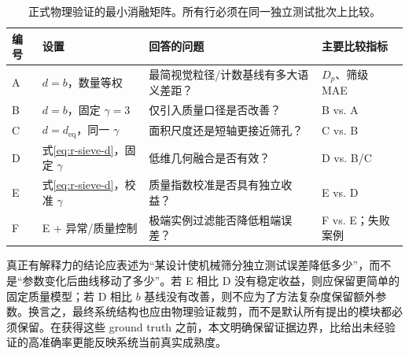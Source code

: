 \begin{table}[t]
\centering
\caption{正式物理验证的最小消融矩阵。所有行必须在同一独立测试批次上比较。}
\label{tab:r-ablation-matrix}
\footnotesize
\renewcommand{\arraystretch}{1.1}
\begin{tabular}{>{\centering\arraybackslash}p{0.8cm}>{\raggedright\arraybackslash}p{4.0cm}>{\raggedright\arraybackslash}p{4.6cm}>{\raggedright\arraybackslash}p{4.0cm}}
\toprule
编号 & 设置 & 回答的问题 & 主要比较指标 \\
\midrule
A & $d=b$，数量等权 & 最简视觉粒径/计数基线有多大语义差距？ & $D_p$、筛级 MAE \\
B & $d=b$，固定 $\gamma=3$ & 仅引入质量口径是否改善？ & B vs. A \\
C & $d=d_{\mathrm{eq}}$，同一 $\gamma$ & 面积尺度还是短轴更接近筛孔？ & C vs. B \\
D & 式\eqref{eq:r-sieve-d}，固定 $\gamma$ & 低维几何融合是否有效？ & D vs. B/C \\
E & 式\eqref{eq:r-sieve-d}，校准 $\gamma$ & 质量指数校准是否具有独立收益？ & E vs. D \\
F & E + 异常/质量控制 & 极端实例过滤能否降低粗端误差？ & F vs. E；失败案例 \\
\bottomrule
\end{tabular}
\end{table}

真正有解释力的结论应表述为“某设计使机械筛分独立测试误差降低多少”，而不是“参数变化后曲线移动了多少”。若 E 相比 D 没有稳定收益，则应保留更简单的固定质量模型；若 D 相比 $b$ 基线没有改善，则不应为了方法复杂度保留额外参数。换言之，最终系统结构也应由物理验证裁剪，而不是默认所有提出的模块都必须保留。在获得这些 ground truth 之前，本文明确保留证据边界，比给出未经验证的高准确率更能反映系统当前真实成熟度。
